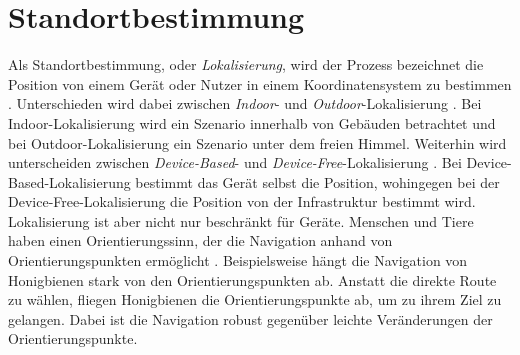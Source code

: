 \chapter{Standortbestimmung}
Als Standortbestimmung, oder \textit{Lokalisierung}, wird der Prozess bezeichnet die Position von einem Gerät oder Nutzer in einem Koordinatensystem zu bestimmen \cite{bulusu2000gps}.
Unterschieden wird dabei zwischen \textit{Indoor}- und \textit{Outdoor}-Lokalisierung \cite{zafari2019survey, bulusu2000gps}.
Bei Indoor-Lokalisierung wird ein Szenario innerhalb von Gebäuden betrachtet und bei Outdoor-Lokalisierung ein Szenario unter dem freien Himmel.
\newline
\newline
Weiterhin wird unterscheiden zwischen \textit{Device-Based}- und \textit{Device-Free}-Lokalisierung \cite{xiao2016survey}.
Bei Device-Based-Lokalisierung bestimmt das Gerät selbst die Position, wohingegen bei der Device-Free-Lokalisierung
die Position von der Infrastruktur bestimmt wird.
\newline
\newline
Lokalisierung ist aber nicht nur beschränkt für Geräte.
Menschen und Tiere haben einen Orientierungssinn, der die Navigation anhand von Orientierungspunkten ermöglicht \cite{menzel1996knowledge}.
Beispielsweise hängt die Navigation von Honigbienen stark von den Orientierungspunkten ab.
Anstatt die direkte Route zu wählen, fliegen Honigbienen die Orientierungspunkte ab, um zu ihrem Ziel zu gelangen.
Dabei ist die Navigation robust gegenüber leichte Veränderungen der Orientierungspunkte.





